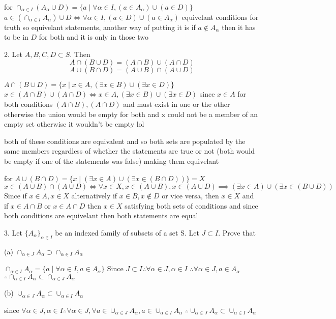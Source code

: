 for $\cap_{\alpha \in I } (A_{\alpha} \cup D) = \{ a \mid \forall \alpha \in I, (a \in A_{\alpha}) \cup (a \in D) \} $
$a \in (\cap_{\alpha \in I} A_{\alpha} ) \cup D \iff \forall \alpha \in I, (a \in D) \cup (a \in A_{\alpha}) $
equivelant conditions for truth so equivelant statements, another way of putting it is if $a \not \in A_{\alpha}$ then it has to be in $D$ for both and it is only in those two

2. Let $A, B, C, D \subset S$. Then $$A \cap (B\cup D) = (A \cap B) \cup (A \cap D)$$ $$ A \cup (B\cap D) = (A \cup B) \cap (A \cup D)$$

$A \cap (B \cup D) = \{ x \mid x \in A, (\exists x \in B) \cup (\exists x \in D)\}$
$x \in (A \cap B) \cup (A \cap D) \iff x \in A,( \exists x \in B) \cup (\exists x \in D)$ since $x \in A$ for both conditions $(A \cap B), (A \cap D)$ and must exist in one or the other otherwise the union would be empty for both and x could not be a member of an empty set otherwise it wouldn't be empty lol

both of these conditions are equivalent and so both sets are populated by the same members regardless of whether the statements are true or not (both would be empty if one of the statements was false) making them equivelant

for $A \cup (B \cap D) = \{ x \mid (\exists x \in A) \cup (\exists x \in (B \cap D)) \} = X$
$x \in (A \cup B) \cap (A \cup D) \iff \forall x\in  X, x  \in (A \cup B), x \in ( A \cup D) \implies (\exists x \in A) \cup  (\exists x \in (B \cup D))$ Since if $x \in A, x \in X$ alternatively if $x \in B, x \not \in D $ or vice versa, then $x \in X$ and if $x \in A \cap B$ or $x \in A \cap D$ then $x \in X$ satisfying both sets of conditions and since both conditions are equivelant then both statements are equal

3. Let $\{ A_{\alpha} \}_{\alpha \in I}$ be an indexed family of subsets of a set S. Let $ J \subset I$. Prove that

(a) $\cap_{\alpha \in J} A_{\alpha} \supset \cap_{\alpha \in I} A_{\alpha}$

$\cap_{\alpha \in I} A_{\alpha}= \{ a \mid \forall \alpha  \in I, a \in A_{\alpha}\}$ 
Since $J \subset I \therefore\forall \alpha \in J, \alpha \in I$
$\therefore \forall \alpha \in J, a \in A_{\alpha}$
$\therefore  \cap_{\alpha \in I} A_{\alpha} \subset \cap_{\alpha \in J} A_{\alpha}$

(b) $\cup_{\alpha \in J} A_{\alpha} \subset \cup_{\alpha \in I}A_{\alpha}$

since $\forall \alpha \in J, \alpha \in I \therefore \forall \alpha \in J, \forall a \in \cup_{\alpha \in J} A_{\alpha}, a \in \cup_{\alpha \in I} A_{\alpha}$
$\therefore \cup_{\alpha \in J} A_{\alpha} \subset \cup_{\alpha \in I} A_{\alpha} $


